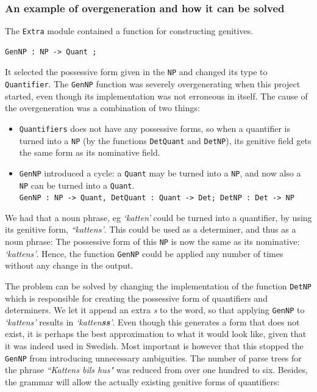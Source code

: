 \documentclass{report}
\begin{document}
\subsubsection{An example of overgeneration and how it can be solved}
The \verb-Extra- module contained a function for constructing genitives.
\begin{verbatim}GenNP : NP -> Quant ;\end{verbatim}
It selected the possessive form given in the \verb-NP- and changed its type
to \verb-Quantifier-. 
The \verb-GenNP- function was severely overgenerating when this project started, even
though its implementation was not erroneous in itself. The cause of the overgeneration 
was a combination of two things:
\begin{itemize}
\item \verb-Quantifiers- does not have any possessive
forms, so when a quantifier is turned into
a \verb-NP- (by the functions \verb-DetQuant- and \verb-DetNP-), its genitive field gets
the same form as its nominative field.
\item\verb-GenNP-
introduced a cycle: a \verb-Quant- may be turned into a \verb-NP-, and now also
a \verb-NP- can be turned into a \verb-Quant-.\\
\verb|GenNP : NP -> Quant, DetQuant : Quant -> Det; DetNP : Det -> NP|
\end{itemize}
We had that a noun phrase, eg \emph{`katten'} could be turned into a quantifier,
by using its genitive form, \emph{``kattens'}. This could be used as a determiner,
and thus as a noun phrase:
The possessive form of this \verb-NP- is now the same as its nominative:
\emph{`kattens'}. Hence, the function \verb-GenNP- could be applied
any number of times without any change in the output.

The problem can be solved by changing the implementation of the function
\verb-DetNP-  which is responsible for creating the possessive form
of quantifiers and determiners.
We let it append an extra
\emph{s} to the word, so that applying \verb-GenNP- to \emph{`kattens'} results
in \emph{`katten\textbf{ss}'}. Even though this generates a form that does not exist, it is perhaps
the best approximation to what it would look like, given that it was indeed used in 
Swedish. Most important is however that this stopped the \verb-GenNP-
from introducing unnecessary ambiguities.
The number of parse trees for the phrase \emph{``Kattens bils hus"} was reduced
from over one hundred to six.
Besides, the grammar will allow the actually existing genitive
forms of quantifiers:
\end{document}
